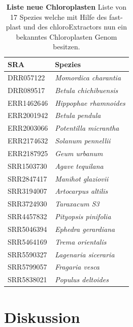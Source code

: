 \documentclass{scrartcl}
\begin{document}
\begin{table}[!h]
\caption[Liste neue Chloroplasten]{\textbf{Liste neue Chloroplasten} Liste von 17 Spezies welche mit Hilfe des fast-plast und des chloroExtractors nun ein bekanntes Chloroplasten Genom besitzen.}
\begin{center}
\begin{tabular}{ll}
SRA & Spezies\\
\hline
DRR057122 & \emph{Momordica charantia}\\
DRR089517 & \emph{Betula chichibuensis}\\
ERR1462646 & \emph{Hippophae rhamnoides}\\
ERR2001942 & \emph{Betula pendula}\\
ERR2003066 & \emph{Potentilla micrantha}\\
ERR2174632 & \emph{Solanum pennellii}\\
ERR2187925 & \emph{Geum urbanum}\\
SRR1503730 & \emph{Agave tequilana}\\
SRR2847417 & \emph{Manihot glaziovii}\\
SRR3194007 & \emph{Artocarpus altilis}\\
SRR3724930 & \emph{Taraxacum S3}\\
SRR4457832 & \emph{Pityopsis pinifolia}\\
SRR5046394 & \emph{Ephedra gerardiana}\\
SRR5464169 & \emph{Trema orientalis}\\
SRR5590327 & \emph{Lagenaria siceraria}\\
SRR5799057 & \emph{Fragaria vesca}\\
SRR5838021 & \emph{Populus deltoides}\\
\end{tabular}
\end{center}
\end{table}

\section{Diskussion}
\label{sec-5}
\end{document}
